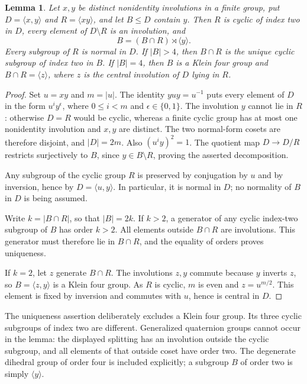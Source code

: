 \documentclass[11pt]{article}
\newtheorem{lemma}[theorem]{Lemma}
\theoremstyle{definition}\newtheorem{definition}[theorem]{Definition}
\newcommand{\gen}[1]{\langle #1\rangle}
\begin{document}
\begin{lemma}\label{lem:dihedral}
Let $x,y$ be distinct nonidentity involutions in a finite group, put
$D=\gen{x,y}$ and $R=\gen{xy}$, and let $B\le D$ contain $y$.
Then $R$ is cyclic of index two in $D$, every element of $D\setminus R$
is an involution, and
\[
                 B=(B\cap R)\rtimes\gen y.
\]
Every subgroup of $R$ is normal in $D$.  If $|B|>4$, then $B\cap R$ is
the unique cyclic subgroup of index two in $B$.  If $|B|=4$, then $B$ is
a Klein four group and $B\cap R=\gen z$, where $z$ is the central
involution of $D$ lying in $R$.
\end{lemma}
\begin{proof}
Set $u=xy$ and $m=|u|$.  The identity $yuy=u^{-1}$ puts every element of
$D$ in the form $u^i y^\epsilon$, where $0\le i<m$ and
$\epsilon\in\{0,1\}$.  The involution $y$ cannot lie in $R$: otherwise
$D=R$ would be cyclic, whereas a finite cyclic group has at most one
nonidentity involution and $x,y$ are distinct.  The two normal-form cosets
are therefore disjoint, and $|D|=2m$.  Also
$(u^iy)^2=1$.  The quotient map $D\to D/R$ restricts surjectively to
$B$, since $y\in B\setminus R$, proving the asserted decomposition.

Any subgroup of the cyclic group $R$ is preserved by conjugation by $u$
and by inversion, hence by $D=\gen{u,y}$.  In particular, it is normal
in $D$; no normality of $B$ in $D$ is being assumed.

Write $k=|B\cap R|$, so that $|B|=2k$.  If $k>2$, a generator of any
cyclic index-two subgroup of $B$ has order $k>2$.  All elements outside
$B\cap R$ are involutions.  This generator must therefore lie in
$B\cap R$, and the equality of orders proves uniqueness.

If $k=2$, let $z$ generate $B\cap R$.  The involutions $z,y$ commute
because $y$ inverts $z$, so $B=\gen{z,y}$ is a Klein four group.
As $R$ is cyclic, $m$ is even and $z=u^{m/2}$.  This element is fixed
by inversion and commutes with $u$, hence is central in $D$.
\end{proof}

The uniqueness assertion deliberately excludes a Klein four group.  Its
three cyclic subgroups of index two are different.  Generalized quaternion
groups cannot occur in the lemma: the displayed splitting has an
involution outside the cyclic subgroup, and all elements of that outside
coset have order two.  The degenerate dihedral group of order four is
included explicitly; a subgroup $B$ of order two is simply $\gen y$.
\end{document}
